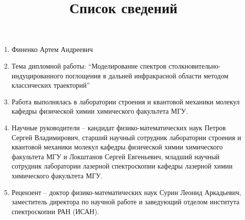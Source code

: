 \documentclass[12pt]{article}
\title{Список сведений}
\date{}
\author{}
\begin{document}
\maketitle

\begin{enumerate}
    \item Финенко Артем Андреевич
    \item Тема дипломной работы: \enquote{Моделирование спектров столкновительно-индуцированного поглощения в дальней инфракрасной области методом классических траекторий}
    \item Работа выполнялась в лаборатории строения и квантовой механики молекул кафедры физической химии химического факультета МГУ.
    \item Научные руководители -- кандидат физико-математических наук Петров Сергей Владимирович, старший научный сотрудник лаборатории строения и квантовой механики молекул кафедры физической химии химического факультета МГУ и Локштанов Сергей Евгеньевич, младший научный сотрудник лаборатории лазерной спектроскопии кафедры лазерной химии химического факультета МГУ.
    \item Рецензент -- доктор физико-математических наук Сурин Леонид Аркадьевич, заместитель директора по научной работе и заведующий отделом института спектроскопии РАН (ИСАН).
\end{enumerate}
\end{document}
